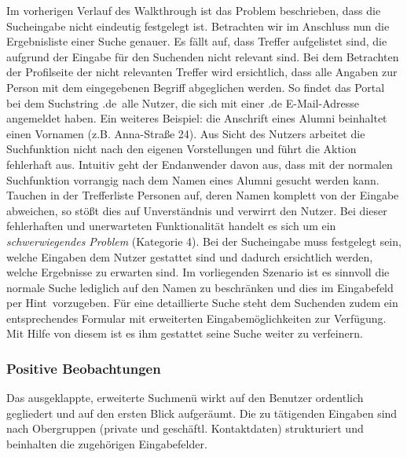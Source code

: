 {
	Im vorherigen Verlauf des Walkthrough ist das Problem beschrieben, dass die Sucheingabe nicht eindeutig festgelegt ist. Betrachten wir im Anschluss nun die Ergebnisliste einer Suche genauer. Es fällt auf, dass Treffer aufgelistet sind, die aufgrund der Eingabe für den Suchenden nicht relevant sind. Bei dem Betrachten der Profilseite der nicht relevanten Treffer wird ersichtlich, dass alle Angaben zur Person mit dem eingegebenen Begriff abgeglichen werden. So findet das Portal bei dem Suchstring \glqq .de\grqq ~alle Nutzer, die sich mit einer .de E-Mail-Adresse angemeldet haben. Ein weiteres Beispiel: die Anschrift eines Alumni beinhaltet einen Vornamen (z.B. Anna-Straße 24).
}
{
	Aus Sicht des Nutzers arbeitet die Suchfunktion nicht nach den eigenen Vorstellungen und führt die Aktion fehlerhaft aus. Intuitiv geht der Endanwender davon aus, dass mit der normalen Suchfunktion vorrangig nach dem Namen eines Alumni gesucht werden kann. Tauchen in der Trefferliste Personen auf, deren Namen komplett von der Eingabe abweichen, so stößt dies auf Unverständnis und verwirrt den Nutzer. Bei dieser fehlerhaften und unerwarteten Funktionalität handelt es sich um ein \emph{schwerwiegendes Problem} (Kategorie 4).
}
{
	Bei der Sucheingabe muss festgelegt sein, welche Eingaben dem Nutzer gestattet sind und dadurch ersichtlich werden, welche Ergebnisse zu erwarten sind. Im vorliegenden Szenario ist es sinnvoll die normale Suche lediglich auf den Namen zu beschränken und dies im Eingabefeld per \glqq Hint\grqq ~vorzugeben. Für eine detaillierte Suche steht dem Suchenden zudem ein entsprechendes Formular mit erweiterten Eingabemöglichkeiten zur Verfügung. Mit Hilfe von diesem ist es ihm gestattet seine Suche weiter zu verfeinern.
} 


\subsubsection*{Positive Beobachtungen}
Das ausgeklappte, erweiterte Suchmenü wirkt auf den Benutzer ordentlich gegliedert und auf den ersten Blick aufgeräumt. Die zu tätigenden Eingaben sind nach Obergruppen (private und geschäftl. Kontaktdaten) strukturiert und beinhalten die zugehörigen Eingabefelder.

